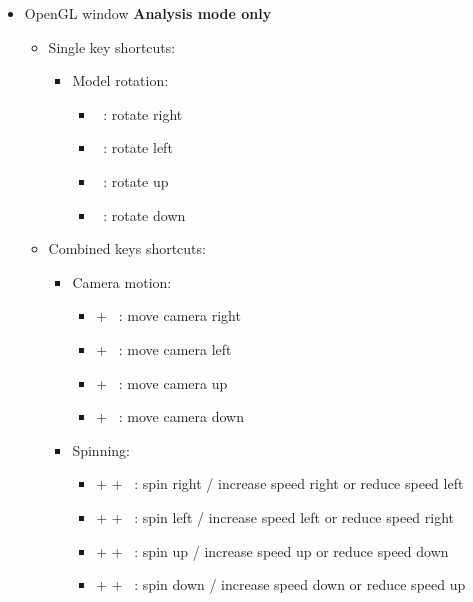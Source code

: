 {\begin{itemize}
\begin{itemize}
\begin{itemize}
\begin{itemize}
\item[] \Ctrl +  : enter / exit fullscreen mode 
\end{itemize}
\item Camera motion: 
\begin{itemize}
\item[] \Shift + \UArrow\ : zoom out
\item[] \Shift + \DArrow\ : zoom in
\end{itemize}
\end{itemize}
\end{itemize}
\item OpenGL window {\bf{Analysis mode only}}
\begin{itemize}
\item Single key shortcuts: 
\begin{itemize}
\item Model rotation: 
\begin{itemize}
\item[] \RArrow\ : rotate right
\item[] \LArrow\ : rotate left
\item[] \UArrow\ : rotate up
\item[] \DArrow\ : rotate down 
\end{itemize}
\end{itemize}
\item Combined keys shortcuts: 
\begin{itemize}
\item Camera motion: 
\begin{itemize}
\item[] \Ctrl + \RArrow\ : move camera right
\item[] \Ctrl + \LArrow\ : move camera left
\item[] \Ctrl + \UArrow\ : move camera up
\item[] \Ctrl + \DArrow\ : move camera down 
\end{itemize}
\item Spinning: 
\begin{itemize}
\item[] \Ctrl + \Shift + \RArrow\ : spin right / increase speed right or reduce speed left
\item[] \Ctrl + \Shift + \RArrow\ : spin left / increase speed left or reduce speed right
\item[] \Ctrl + \Shift + \UArrow\ : spin up / increase speed up or reduce speed down
\item[] \Ctrl + \Shift + \DArrow\ : spin down / increase speed down or reduce speed up 

\end{itemize}
\end{itemize}
\end{itemize}
\end{itemize}}
